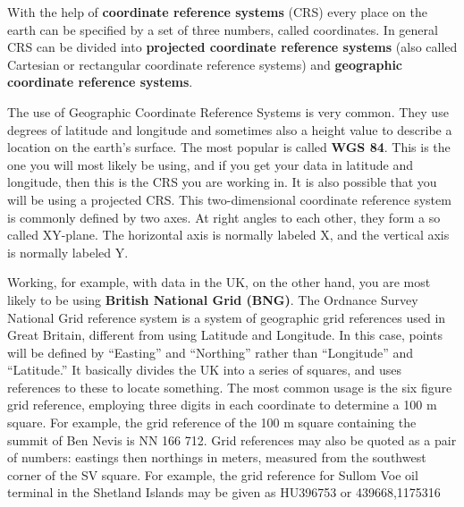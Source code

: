 \documentclass[
]{book}
\begin{document}
With the help of \textbf{coordinate reference systems} (CRS) every place on the earth can be specified by a set of three numbers, called coordinates. In general CRS can be divided into \textbf{projected coordinate reference systems} (also called Cartesian or rectangular coordinate reference systems) and \textbf{geographic coordinate reference systems}.

The use of Geographic Coordinate Reference Systems is very common. They use degrees of latitude and longitude and sometimes also a height value to describe a location on the earth's surface. The most popular is called \textbf{WGS 84}. This is the one you will most likely be using, and if you get your data in latitude and longitude, then this is the CRS you are working in. It is also possible that you will be using a projected CRS. This two-dimensional coordinate reference system is commonly defined by two axes. At right angles to each other, they form a so called XY-plane. The horizontal axis is normally labeled X, and the vertical axis is normally labeled Y.

Working, for example, with data in the UK, on the other hand, you are most likely to be using \textbf{British National Grid (BNG)}. The Ordnance Survey National Grid reference system is a system of geographic grid references used in Great Britain, different from using Latitude and Longitude. In this case, points will be defined by ``Easting'' and ``Northing'' rather than ``Longitude'' and ``Latitude.'' It basically divides the UK into a series of squares, and uses references to these to locate something. The most common usage is the six figure grid reference, employing three digits in each coordinate to determine a 100 m square. For example, the grid reference of the 100 m square containing the summit of Ben Nevis is NN 166 712. Grid references may also be quoted as a pair of numbers: eastings then northings in meters, measured from the southwest corner of the SV square. For example, the grid reference for Sullom Voe oil terminal in the Shetland Islands may be given as HU396753 or 439668,1175316
\end{document}
